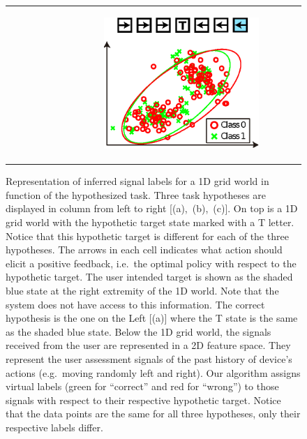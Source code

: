 \documentclass[letterpaper]{article}
\begin{document}
\begin{figure}[!ht]
\begin{tabular}{c|c|c}
\begin{subfigure}[t]{0.29\columnwidth}
\begin{center}
            \caption{}
            \label{fig:GM2}
            \end{center}
        \end{subfigure}
        &
        \begin{subfigure}[t]{0.29\columnwidth}
            \begin{flushright}
            \includegraphics[width=\columnwidth]{img/GM3}
            \caption{}
            \label{fig:GM3}
            \end{flushright}
        \end{subfigure}
    \end{tabular}
\caption[]{Representation of inferred signal labels for a 1D grid world in function of the hypothesized task. Three task hypotheses are displayed in column from left to right [(a),~(b),~(c)]. On top is a 1D grid world with the hypothetic target state marked with a T letter. Notice that this hypothetic target is different for each of the three hypotheses. The arrows in each cell indicates what action should elicit a positive feedback, i.e.\ the optimal policy with respect to the hypothetic target. The user intended target is shown as the shaded blue state at the right extremity of the 1D world. Note that the system does not have access to this information. The correct hypothesis is the one on the Left [(a)] where the T state is the same as the shaded blue state.
Below the 1D grid world, the signals received from the user are represented in a 2D feature space. They represent the user assessment signals of the past history of device's actions (e.g.\ moving randomly left and right). Our algorithm assigns virtual labels (green for ``correct'' and red for ``wrong'') to those signals with respect to their respective hypothetic target. Notice that the data points are the same for all three hypotheses, only their respective labels differ.
}
\end{figure}
\end{document}
